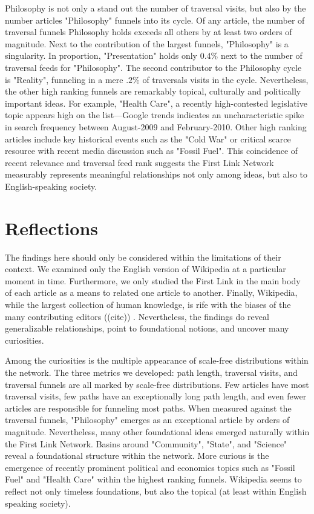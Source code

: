 \documentclass[twoside]{article}
\begin{document}
Philosophy is not only a stand out the number of traversal visits, but also by the number articles "Philosophy" funnels into
its cycle. Of any article, the number of traversal funnels Philosophy holds exceeds 
all others by at least two orders of magnitude.
Next to the contribution of the largest funnels, "Philosophy" is a singularity. 
In proportion, "Presentation" holds only $0.4\%$ next to the number of traversal feeds for "Philosophy".
The second contributor to the Philosophy cycle is "Reality", funneling in a mere $.2\%$ of traversals visits in the cycle.
Nevertheless, the other high ranking funnels are remarkably topical, culturally and politically important ideas.  For example, "Health Care", a recently high-contested legislative topic appears high on the list---Google trends indicates an uncharacteristic spike in search frequency between August-2009 and February-2010.
Other high ranking articles include key historical events such as the "Cold War" or critical scarce resource with recent 
media discussion such as "Fossil Fuel".
This coincidence of recent relevance and traversal feed rank suggests the First Link Network measurably represents
meaningful relationships not only among ideas, but also to English-speaking society. 


\section{Reflections}

The findings here should only be considered within the limitations of their context.
We examined only the English version of Wikipedia at a particular moment in time.
Furthermore, we only studied the First Link in the main body of each article
as a means to related one article to another. Finally, Wikipedia, while the largest 
collection of human knowledge, is rife with the biases of the many contributing editors ((cite))
. Nevertheless, the findings do reveal
generalizable relationships, point to foundational notions, and uncover many curiosities.


Among the curiosities is the multiple appearance of scale-free distributions within the network. 
The three metrics we developed: path length, traversal visits, and traversal funnels are all marked 
by scale-free distributions. Few articles have most traversal visits, few paths have an exceptionally long path length, and even fewer
articles are responsible for funneling most paths. When measured against the traversal funnels, 
"Philosophy" emerges as an exceptional article by orders of magnitude. 
Nevertheless, many other foundational ideas emerged naturally within the First Link Network. 
Basins around "Community", "State", and "Science" reveal a foundational structure within the network. 
More curious is the emergence of recently prominent political and economics topics such as "Fossil Fuel" and "Health Care" 
within the highest ranking funnels. 
Wikipedia seems to reflect not only timeless foundations, but also the topical (at least within English speaking society).
\end{document}
